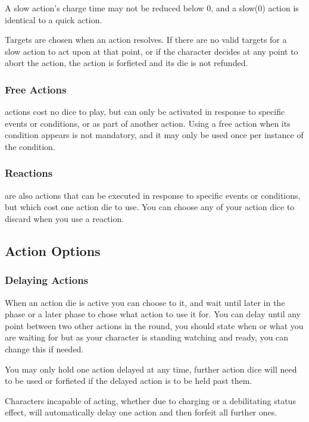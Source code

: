 \begin{multicols}{2}
            A slow action's charge time may not be reduced below 0, and a slow(0) action is identical to a quick action.

            Targets are chosen when an action resolves. If there are no valid targets for a slow action to act upon at that point, or if the character decides at any point to abort the action, the action is forfieted and its die is not refunded.

        \subsubsection{Free Actions}
             actions cost no dice to play, but can only be activated in response to specific events or conditions, or as part of another action. Using a free action when its condition appears is not mandatory, and it may only be used once per instance of the condition.

        \subsubsection{Reactions}
             are also actions that can be executed in response to specific events or conditions, but which cost one action die to use. You can choose any of your action dice to discard when you use a reaction.


    \subsection{Action Options}
        \subsubsection{Delaying Actions}
            When an action die is active you can choose to  it, and wait until later in the phase or a later phase to chose what action to use it for. You can delay until any point between two other actions in the round, you should state when or what you are waiting for but as your character is standing watching and ready, you can change this if needed.

            You may only hold one action delayed at any time, further action dice will need to be used or forfieted if the delayed action is to be held past them.

            Characters incapable of acting, whether due to charging or a debilitating status effect, will automatically delay one action and then forfeit all further ones.


\end{multicols}
